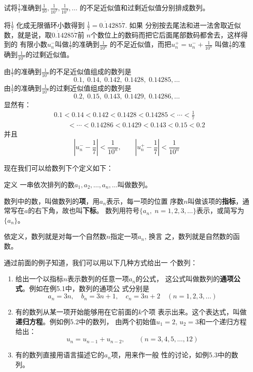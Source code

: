\begin{example}
    试将$\frac{1}{7}$准确到$\frac{1}{10},\frac{1}{10^2},\frac{1}{10^3},\ldots$
的不足近似值和过剩近似值分别排成数列。
\end{example}

\begin{solution}
    将$\frac{1}{7}$
化成无限循环小数得到
$\frac{1}{7}=0.\dot{1}4285\dot{7}$. 如果
分别按去尾法和进一法舍取近似数，就是说，取$0.\dot{1}4285\dot{7}$前
$n$个数位上的数码而把它后面尾部数码都舍去，这样得到的
有限小数$u_n^-$叫做$\frac{1}{7}$的准确到$\frac{1}{10^n}$
的不足近似值，而把$u_n^+=u_n^-+\frac{1}{10^n}$
叫做$\frac{1}{7}$的准确到$\frac{1}{10^n}$的过剩近似值。

由$\frac{1}{7}$的准确到$\frac{1}{10^n}$的不足近似值组成的数列是
\[0.1,\; 0.14,\; 0.142,\; 0.1428,\; 0.14285,\ldots\]
由$\frac{1}{7}$的准确到$\frac{1}{10^n}$的过剩近似值组成的数列是
\[0.2,\; 0.15,\; 0.143,\; 0.1429,\; 0.14286,\ldots\]
显然有：
\[\begin{split}
   & 0.1<0.14<0.142<0.1428<0.14285<\cdots<\frac{1}{7}\\
   &\qquad <\cdots<
0.14286<0.1429<0.143<0.15<0.2
\end{split}\]
并且
\[\left|u_n^--\frac{1}{7} \right|<\frac{1}{10^n},\qquad \left|u_n^+-\frac{1}{7} \right|<\frac{1}{10^n}\]
\end{solution}

现在我们可以给数列下个定义如下：
\begin{blk}{定义}
    一串依次排列的数$a_1,a_2,\ldots,a_n,\ldots$叫做数列。

    数列中的数，叫做数列的\textbf{项}，用$a_n$表示，每一项的位置
序数$n$叫做该项的\textbf{指标}，通常写在$a$的右下角，故也叫\textbf{下标}。
数列用符号$\{a_n,\; n=1,2,3,\ldots\}$表示，或简写为$\{a_n\}$。
\end{blk}

依定义，数列就是对每一个自然数$n$指定一项$a_n$, 换言
之，数列就是自然数的函数。

通过前面的例子知道，我们可以用以下几种方式给出一
个数列：
\begin{enumerate}
\item 给出一个以指标$n$表示数列的任意一项$a_n$的公式，
这公式叫做数列的\textbf{通项公式}。例如在例5.1中，数列的通项公
式分别是
\[a_n=3n,\quad b_n=3n+1,\quad c_n=3n+2 \quad (n=1,2,3,\ldots)\]
\item 有的数列从某一项开始能够用在它前面的$k$个项
表示出来。这个表达式，叫做\textbf{递归方程}。例如例5.2中的数列，
由两个初始值$u_1=2$, $u_2=3$和一个递归方程给出：
\[u_n=u_{n-1}+u_{n-2},\qquad (n=3,4,5,\ldots,12)\]
\item 有的数列直接用语言描述它的$a_n$项，用来作一般
性的讨论，如例5.3中的数列。
\end{enumerate}


